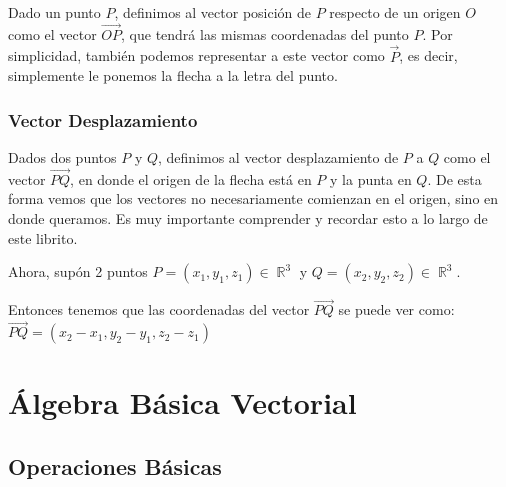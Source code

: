 \documentclass[12pt, fleqn]{report}                             %
\theoremstyle{break}                                            %
\DeclareMathOperator \Reals        {\mathbb{R}}                 %
\newcommand{\lVec}[1]{\overrightarrow{#1}}                      %
\begin{document}
                Dado un punto $P$, definimos al vector posición de $P$ respecto de un origen $O$ como
                el vector $\lVec{OP}$, que tendrá las mismas coordenadas del punto $P$. Por simplicidad, también podemos representar a este vector como $\vec{P}$, es decir, simplemente le ponemos la flecha a la letra del punto.
            
            \subsection{Vector Desplazamiento}
            
                Dados dos puntos $P$ y $Q$, definimos al vector desplazamiento de $P$ a $Q$ como el
                vector $\lVec{PQ}$, en donde el origen de la flecha está en $P$ y la punta en $Q$.
                De esta forma vemos que los vectores no necesariamente comienzan en el origen,
                sino en donde queramos. Es muy importante comprender y recordar esto a lo largo
                de este librito.

                Ahora, supón 2 puntos $P = (x_1, y_1, z_1) \in \Reals^3$ y $Q = (x_2, y_2, z_2) \in \Reals^3$.

                Entonces tenemos que las coordenadas del vector $\lVec{PQ}$ se puede ver como:\\
                $\lVec{PQ} = (x_2 - x_1, y_2 - y_1, z_2 - z_1)$




    \chapter{Álgebra Básica Vectorial}
            

        \clearpage
        \section{Operaciones Básicas}
            
\end{document}
